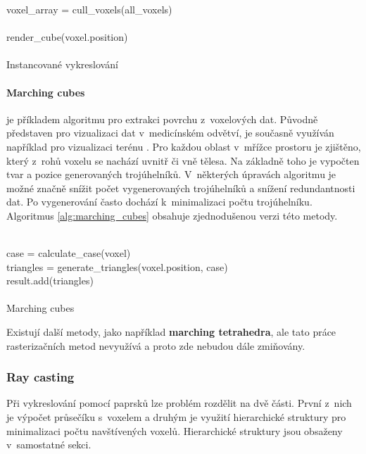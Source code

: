 \begin{center}
	\begin{czechalgorithm}[H] \label{alg:instanced_cube}
		voxel\_array = cull\_voxels(all\_voxels)\\
		 {\\
			render\_cube(voxel.position)\\
		}\\
		\caption{Instancované vykreslování}
	\end{czechalgorithm}
\end{center}

\paragraph{Marching cubes \cite{marching_cubes}} je příkladem algoritmu pro extrakci povrchu z~voxelových dat. Původně představen pro vizualizaci dat v~medicínském odvětví, je současně využíván například pro vizualizaci terénu \cite{nguyen_2008}. Pro každou oblast v~mřížce prostoru je zjištěno, který z~rohů voxelu se nachází uvnitř či vně tělesa. Na základně toho je vypočten tvar a pozice generovaných trojúhelníků. V~některých úpravách algoritmu je možné značně snížit počet vygenerovaných trojúhelníků a snížení redundantnosti dat. Po vygenerování často dochází k~minimalizaci počtu trojúhelníku. Algoritmus \ref{alg:marching_cubes} obsahuje zjednodušenou verzi této metody.

\begin{center}
	\begin{czechalgorithm}[H] \label{alg:marching_cubes}
		 {\\
			case = calculate\_case(voxel)\\
			triangles = generate\_triangles(voxel.position, case)\\
			result.add(triangles)\\
		}\\
		\caption{Marching cubes}
	\end{czechalgorithm}
\end{center}

Existují další metody, jako například \textbf{marching tetrahedra}, ale tato práce rasterizačních metod nevyužívá a proto zde nebudou dále zmiňovány.

\subsubsection{Ray casting} \label{sec:voxel_intersection}
Při vykreslování pomocí paprsků lze problém rozdělit na dvě části. První z~nich je výpočet průsečíku s~voxelem a druhým je využití hierarchické struktury pro minimalizaci počtu navštívených voxelů. Hierarchické struktury jsou obsaženy v~samostatné sekci.

